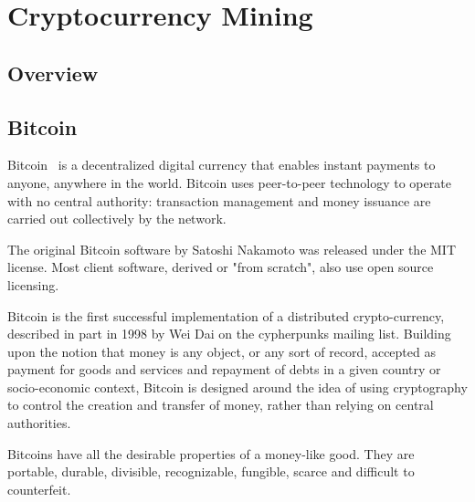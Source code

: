 \chapter*{Cryptocurrency Mining}
%
\setcounter{section}{0}
\section{Overview}
%
\section{Bitcoin}
Bitcoin~\cite{Nakamoto_bitcoin:a} is a decentralized digital currency that enables instant payments to anyone, anywhere in the world. Bitcoin uses peer-to-peer technology to operate with no central authority: transaction management and money issuance are carried out collectively by the network.

The original Bitcoin software by Satoshi Nakamoto was released under the MIT license. Most client software, derived or "from scratch", also use open source licensing.

Bitcoin is the first successful implementation of a distributed crypto-currency, described in part in 1998 by Wei Dai on the cypherpunks mailing list. Building upon the notion that money is any object, or any sort of record, accepted as payment for goods and services and repayment of debts in a given country or socio-economic context, Bitcoin is designed around the idea of using cryptography to control the creation and transfer of money, rather than relying on central authorities.

Bitcoins have all the desirable properties of a money-like good. They are portable, durable, divisible, recognizable, fungible, scarce and difficult to counterfeit.

%
%
%
%
